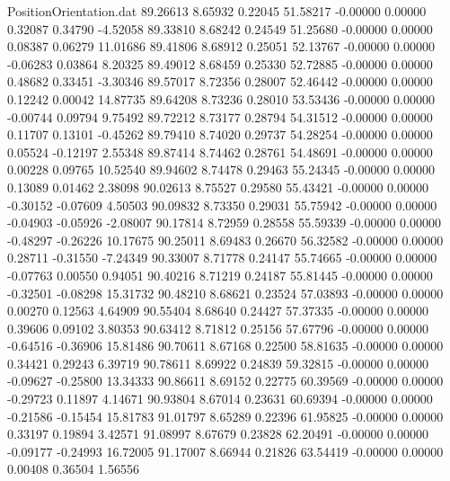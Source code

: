 \begin{filecontents}{PositionOrientation.dat}
  89.26613    8.65932    0.22045    51.58217   -0.00000    0.00000    0.32087    0.34790   -4.52058
  89.33810    8.68242    0.24549    51.25680   -0.00000    0.00000    0.08387    0.06279   11.01686
  89.41806    8.68912    0.25051    52.13767   -0.00000    0.00000   -0.06283    0.03864    8.20325
  89.49012    8.68459    0.25330    52.72885   -0.00000    0.00000    0.48682    0.33451   -3.30346
  89.57017    8.72356    0.28007    52.46442   -0.00000    0.00000    0.12242    0.00042   14.87735
  89.64208    8.73236    0.28010    53.53436   -0.00000    0.00000   -0.00744    0.09794    9.75492
  89.72212    8.73177    0.28794    54.31512   -0.00000    0.00000    0.11707    0.13101   -0.45262
  89.79410    8.74020    0.29737    54.28254   -0.00000    0.00000    0.05524   -0.12197    2.55348
  89.87414    8.74462    0.28761    54.48691   -0.00000    0.00000    0.00228    0.09765   10.52540
  89.94602    8.74478    0.29463    55.24345   -0.00000    0.00000    0.13089    0.01462    2.38098
  90.02613    8.75527    0.29580    55.43421   -0.00000    0.00000   -0.30152   -0.07609    4.50503
  90.09832    8.73350    0.29031    55.75942   -0.00000    0.00000   -0.04903   -0.05926   -2.08007
  90.17814    8.72959    0.28558    55.59339   -0.00000    0.00000   -0.48297   -0.26226   10.17675
  90.25011    8.69483    0.26670    56.32582   -0.00000    0.00000    0.28711   -0.31550   -7.24349
  90.33007    8.71778    0.24147    55.74665   -0.00000    0.00000   -0.07763    0.00550    0.94051
  90.40216    8.71219    0.24187    55.81445   -0.00000    0.00000   -0.32501   -0.08298   15.31732
  90.48210    8.68621    0.23524    57.03893   -0.00000    0.00000    0.00270    0.12563    4.64909
  90.55404    8.68640    0.24427    57.37335   -0.00000    0.00000    0.39606    0.09102    3.80353
  90.63412    8.71812    0.25156    57.67796   -0.00000    0.00000   -0.64516   -0.36906   15.81486
  90.70611    8.67168    0.22500    58.81635   -0.00000    0.00000    0.34421    0.29243    6.39719
  90.78611    8.69922    0.24839    59.32815   -0.00000    0.00000   -0.09627   -0.25800   13.34333
  90.86611    8.69152    0.22775    60.39569   -0.00000    0.00000   -0.29723    0.11897    4.14671
  90.93804    8.67014    0.23631    60.69394   -0.00000    0.00000   -0.21586   -0.15454   15.81783
  91.01797    8.65289    0.22396    61.95825   -0.00000    0.00000    0.33197    0.19894    3.42571
  91.08997    8.67679    0.23828    62.20491   -0.00000    0.00000   -0.09177   -0.24993   16.72005
  91.17007    8.66944    0.21826    63.54419   -0.00000    0.00000    0.00408    0.36504    1.56556

\end{filecontents}
